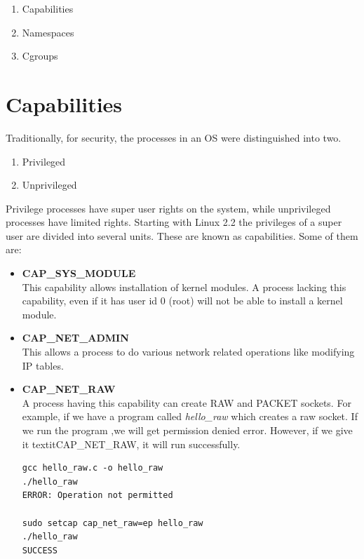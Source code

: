 \documentclass[twoside]{iitbreport}
\begin{document}
\begin{enumerate}
\item Capabilities
\item Namespaces
\item Cgroups
\end{enumerate}

\section{Capabilities}
Traditionally, for security, the processes in an OS were distinguished into two.

\begin{enumerate}
\item Privileged
\item Unprivileged
\end{enumerate}

Privilege processes have super user rights on the system, while unprivileged processes have limited rights. Starting with Linux 2.2 the privileges of a super user are divided into several units. These are known as capabilities. Some of them are:

\begin{itemize}
\item \textbf{CAP\_SYS\_MODULE}\\
This capability allows installation of kernel modules. A process lacking this capability, even if it has user id 0 (root) will not be able to install a kernel module.

\item \textbf{CAP\_NET\_ADMIN}\\
This allows a process to do various network related operations like modifying IP tables.

\item \textbf{CAP\_NET\_RAW}\\
A process having this capability can create RAW and PACKET sockets. For example, if we have a program called \textit{hello\_raw} which creates a raw socket. If we run the program ,we will get permission denied error. However, if we give it textit{CAP\_NET\_RAW}, it will run successfully.\\
\begin{lstlisting}
gcc hello_raw.c -o hello_raw
./hello_raw
ERROR: Operation not permitted

sudo setcap cap_net_raw=ep hello_raw
./hello_raw
SUCCESS
\end{lstlisting}
\end{itemize}
\end{document}
